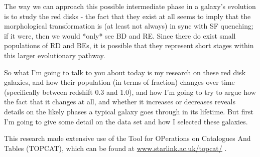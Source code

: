 \documentclass[useAMS,usenatbib]{mn2e}
\begin{document}
The way we can approach this possible intermediate phase in a galaxy's evolution is to study the red disks - the fact that they exist at all seems to imply that the morphological transformation is (at least not always) in sync with SF quenching; if it were, then we would *only* see BD and RE. Since there do exist small populations of RD and BEs, it is possible that they represent short stages within this larger evolutionary pathway. 

So what I'm going to talk to you about today is my research on these red disk galaxies, and how their population (in terms of fraction) changes over time (specifically between redshift 0.3 and 1.0), and how I'm going to try to argue how the fact that it changes at all, and whether it increases or decreases reveals details on the likely phases a typical galaxy goes through in its lifetime. But first I'm going to give some detail on the data set and how I selected these galaxies. 

This research made extensive use of the Tool for OPerations on Catalogues And Tables (TOPCAT), which can be found at \url{www.starlink.ac.uk/topcat/} \citep{tay05}. 




  
\end{document}
